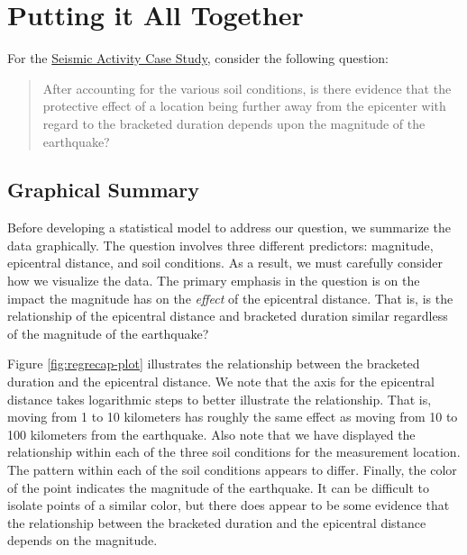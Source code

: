 \documentclass[
]{book}
\theoremstyle{plain}
\theoremstyle{mydefn}
\theoremstyle{myexmpl}
\theoremstyle{remark}
\begin{document}
\hypertarget{Regrecap}{%
\chapter{Putting it All Together}\label{Regrecap}}

For the \protect\hyperlink{CaseGreece}{Seismic Activity Case Study}, consider the following question:

\begin{quote}
After accounting for the various soil conditions, is there evidence that the protective effect of a location being further away from the epicenter with regard to the bracketed duration depends upon the magnitude of the earthquake?
\end{quote}

\hypertarget{graphical-summary}{%
\section{Graphical Summary}\label{graphical-summary}}

Before developing a statistical model to address our question, we summarize the data graphically. The question involves three different predictors: magnitude, epicentral distance, and soil conditions. As a result, we must carefully consider how we visualize the data. The primary emphasis in the question is on the impact the magnitude has on the \emph{effect} of the epicentral distance. That is, is the relationship of the epicentral distance and bracketed duration similar regardless of the magnitude of the earthquake?

Figure \ref{fig:regrecap-plot} illustrates the relationship between the bracketed duration and the epicentral distance. We note that the axis for the epicentral distance takes logarithmic steps to better illustrate the relationship. That is, moving from 1 to 10 kilometers has roughly the same effect as moving from 10 to 100 kilometers from the earthquake. Also note that we have displayed the relationship within each of the three soil conditions for the measurement location. The pattern within each of the soil conditions appears to differ. Finally, the color of the point indicates the magnitude of the earthquake. It can be difficult to isolate points of a similar color, but there does appear to be some evidence that the relationship between the bracketed duration and the epicentral distance depends on the magnitude.
\end{document}
